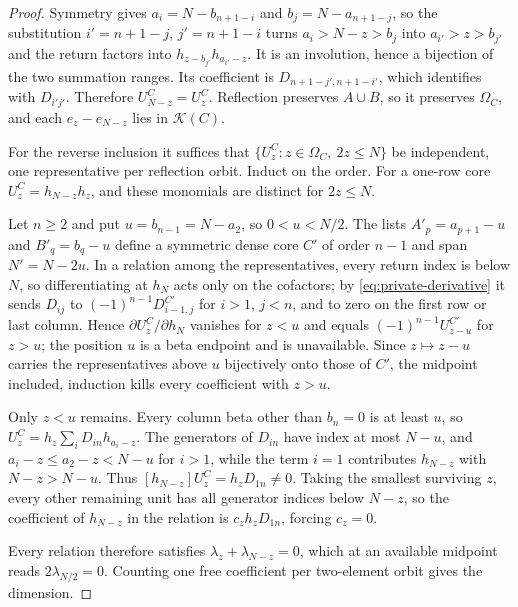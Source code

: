 \documentclass[11pt,a4paper]{amsart}
\numberwithin{equation}{section}
\theoremstyle{plain}
\theoremstyle{definition}
\newcommand{\K}{\mathcal K}
\begin{document}
\begin{proof}
Symmetry gives \(a_i=N-b_{n+1-i}\) and \(b_j=N-a_{n+1-j}\), so the substitution
\(i'=n+1-j\), \(j'=n+1-i\) turns \(a_i>N-z>b_j\) into \(a_{i'}>z>b_{j'}\) and the
return factors into \(h_{z-b_{j'}}h_{a_{i'}-z}\).  It is an involution, hence a
bijection of the two summation ranges.  Its coefficient is
\(D_{n+1-j',n+1-i'}\), which  identifies with
\(D_{i'j'}\).  Therefore \(U_{N-z}^C=U_z^C\).  Reflection preserves \(A\cup B\),
so it preserves \(\Omega_C\), and each \(e_z-e_{N-z}\) lies in \(\K(C)\).

For the reverse inclusion it suffices that \(\{U_z^C:z\in\Omega_C,\ 2z\le N\}\)
be independent, one representative per reflection orbit.  Induct on the order.
For a one-row core \(U_z^C=h_{N-z}h_z\), and these monomials are distinct for
\(2z\le N\).

Let \(n\ge2\) and put \(u=b_{n-1}=N-a_2\), so \(0<u<N/2\).  The lists
\(A'_p=a_{p+1}-u\) and \(B'_q=b_q-u\) define a symmetric dense core \(C'\) of
order \(n-1\) and span \(N'=N-2u\).  In a relation among the representatives,
every return index is below \(N\), so differentiating at \(h_N\) acts only on the
cofactors; by \eqref{eq:private-derivative} it sends \(D_{ij}\) to
\((-1)^{n-1}D^{C'}_{i-1,j}\) for \(i>1\), \(j<n\), and to zero on the first row or
last column.  Hence \(\partial U_z^C/\partial h_N\) vanishes for \(z<u\) and
equals \((-1)^{n-1}U_{z-u}^{C'}\) for \(z>u\); the position \(u\) is a beta
endpoint and is unavailable.  Since \(z\mapsto z-u\) carries the representatives
above \(u\) bijectively onto those of \(C'\), the midpoint included, induction
kills every coefficient with \(z>u\).

Only \(z<u\) remains.  Every column beta other than \(b_n=0\) is at least \(u\),
so \(U_z^C=h_z\sum_iD_{in}h_{a_i-z}\).  The generators of \(D_{in}\) have index at
most \(N-u\), and \(a_i-z\le a_2-z<N-u\) for \(i>1\), while the term \(i=1\)
contributes \(h_{N-z}\) with \(N-z>N-u\).  Thus
\([h_{N-z}]U_z^C=h_zD_{1n}\ne0\).  Taking the smallest surviving \(z\), every
other remaining unit has all generator indices below \(N-z\), so the coefficient
of \(h_{N-z}\) in the relation is \(c_zh_zD_{1n}\), forcing \(c_z=0\).

Every relation therefore satisfies \(\lambda_z+\lambda_{N-z}=0\), which at an
available midpoint reads \(2\lambda_{N/2}=0\).  Counting one free coefficient per
two-element orbit gives the dimension.
\end{proof}
\end{document}
